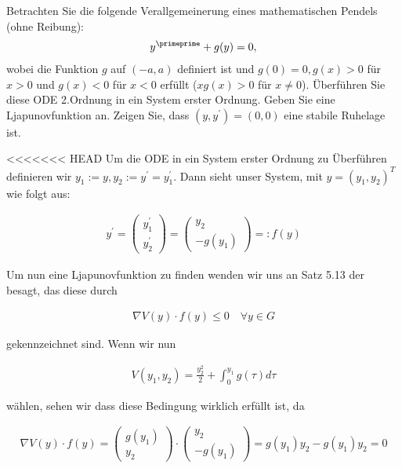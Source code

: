 \begin{exercise}
Betrachten Sie die folgende Verallgemeinerung eines mathematischen Pendels (ohne Reibung):
\begin{align*}
  y^{\primeprime} + g(y) = 0,
\end{align*}
wobei die Funktion $g$ auf $(-a,a)$ definiert ist und $g(0) = 0, g(x) > 0$ für $x > 0$
und $g(x) < 0$ für $x < 0$ erfüllt ($xg(x) > 0$ für $x \neq 0$). Überführen Sie
diese ODE 2.Ordnung in ein System erster Ordnung. Geben Sie eine Ljapunovfunktion
an. Zeigen Sie, dass $(y,y^{\prime}) = (0,0)$ eine stabile Ruhelage ist.
\end{exercise}
\begin{solution}
<<<<<<< HEAD
Um die ODE in ein System erster Ordnung zu Überführen definieren wir $y_1:=y,
y_2:= y^\prime = y_1^\prime$. Dann sieht unser System, mit $y= (y_1,y_2)^T$ wie folgt aus:

\begin{align*}
  y^\prime = \left(
  \begin{array}{c}
    y_1^\prime \\
    y_2^\prime
  \end{array}
  \right) = \left(
  \begin{array}{c}
    y_2 \\
    -g(y_1)
  \end{array}
  \right) =: f(y)
\end{align*}

Um nun eine Ljapunovfunktion zu finden wenden wir uns an Satz 5.13 der besagt, das diese
durch

\begin{align*}
  \nabla V(y) \cdot f(y) \leq 0 \quad \forall y \in G
\end{align*}

gekennzeichnet sind. Wenn wir nun

\begin{align*}
  V(y_1,y_2) = \frac{y_2^2}{2} + \int_0^{y_1}g(\tau)d\tau
\end{align*}

wählen, sehen wir dass diese Bedingung wirklich erfüllt ist, da

\begin{align*}
  \nabla V(y) \cdot f(y) = \left(
  \begin{array}{c}
    g(y_1)\\
    y_2
  \end{array}
  \right)
  \cdot \left(
  \begin{array}{c}
   y_2 \\
  -g(y_1)
  \end{array}
  \right) = g(y_1) y_2 - g(y_1) y_2 = 0
\end{align*}


\end{solution}
